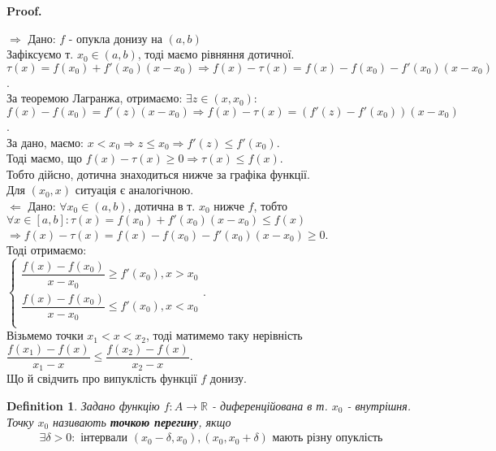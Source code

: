 \documentclass[a4paper, 14pt]{article}
\makeatletter
\def\qed{$\blacksquare$}
\def\rightproof{$\boxed{\Rightarrow}$ }
\def\leftproof{$\boxed{\Leftarrow}$ }
\theoremstyle{theoremdd}
\theoremstyle{theoremdd}
\newtheorem{definition}[theorem]{Definition}
\theoremstyle{theoremdd}
\theoremstyle{theoremdd}
\theoremstyle{theoremdd}
\theoremstyle{theoremdd}
\theoremstyle{theoremdd}
\theoremstyle{theoremdd}
\renewenvironment{proof}[1][Proof.\\]{\par
\pushQED{\hfill \qed}%
\normalfont \topsep6\p@\@plus6\p@\relax
\trivlist
\item\relax
{\bfseries
#1\@addpunct{.}}\hspace\labelsep\ignorespaces
}{%
\popQED\endtrivlist\@endpefalse
}
\makeatother
\begin{document}
\begin{proof}
\rightproof Дано: $f$ - опукла донизу на $(a,b)$\\
Зафіксуємо т. $x_0 \in (a,b)$, тоді маємо рівняння дотичної.\\
$\tau(x) = f(x_0) + f'(x_0)(x-x_0) \Rightarrow f(x) - \tau(x) = f(x) - f(x_0) - f'(x_0)(x-x_0)$.\\
За теоремою Лагранжа, отримаємо: $\exists z \in (x,x_0):$ \\
$f(x) - f(x_0) = f'(z)(x-x_0) \Rightarrow f(x) - \tau(x) = (f'(z) - f'(x_0))(x-x_0)$.\\
За дано, маємо: $x < x_0 \Rightarrow z \leq x_0 \Rightarrow f'(z) \leq f'(x_0)$.\\
Тоді маємо, що $f(x) - \tau(x) \geq 0 \Rightarrow \tau(x) \leq f(x)$.\\
Тобто дійсно, дотична знаходиться нижче за графіка функції.\\
Для $(x_0,x)$ ситуація є аналогічною.
\bigskip \\
\leftproof Дано: $\forall x_0 \in (a,b)$, дотична в т. $x_0$ нижче $f$, тобто\\
$\forall x \in [a,b]: \tau(x) = f(x_0) + f'(x_0)(x-x_0) \leq f(x)$\\
$\Rightarrow f(x) - \tau(x) = f(x) - f(x_0) - f'(x_0)(x-x_0) \geq 0$.\\
Тоді отримаємо:\\
$\begin{cases}
\dfrac{f(x)-f(x_0)}{x-x_0} \geq f'(x_0), x > x_0 \\
\dfrac{f(x)-f(x_0)}{x-x_0} \leq f'(x_0), x < x_0 \\
\end{cases}
$.\\
Візьмемо точки $x_1 < x < x_2$, тоді матимемо таку нерівність\\
$\dfrac{f(x_1)-f(x)}{x_1-x} \leq \dfrac{f(x_2)-f(x)}{x_2-x}$.\\
Що й свідчить про випуклість функції $f$ донизу.
\end{proof}
\fi

\begin{definition}
Задано функцію $f: A \to \mathbb{R}$ - диференційована в т. $x_0$ - внутрішня.\\
Точку $x_0$ називають \textbf{точкою перегину}, якщо
\begin{align*}
\exists \delta > 0: \text{ інтервали } (x_0-\delta,x_0), (x_0,x_0+\delta) \text{ мають різну опуклість}
\end{align*}
\end{definition}
\end{document}
